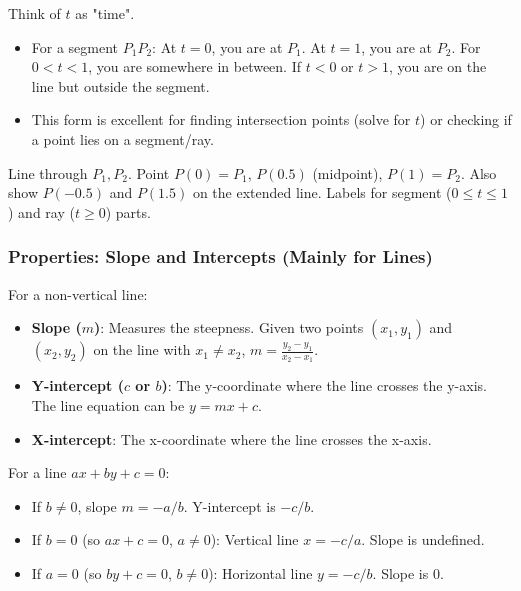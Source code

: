 \begin{intuition}
\label{intuition:A.1.2.parametric}
Think of $t$ as "time".
\begin{itemize}
    \item For a segment $P_1P_2$: At $t=0$, you are at $P_1$. At $t=1$, you are at $P_2$. For $0 < t < 1$, you are somewhere in between. If $t<0$ or $t>1$, you are on the line but outside the segment.
    \item This form is excellent for finding intersection points (solve for $t$) or checking if a point lies on a segment/ray.
\end{itemize}
\end{intuition}

\begin{visualexample}
\label{vis:A.1.2.parametric}
Line through $P_1, P_2$.
Point $P(0)=P_1$, $P(0.5)$ (midpoint), $P(1)=P_2$.
Also show $P(-0.5)$ and $P(1.5)$ on the extended line.
Labels for segment ($0 \le t \le 1$) and ray ($t \ge 0$) parts.
\end{visualexample}

\subsubsection{Properties: Slope and Intercepts (Mainly for Lines)}
\label{sssec:A.1.2.3}

\begin{definition}
\label{def:A.1.2.slope_intercept}
For a non-vertical line:
\begin{itemize}
    \item \textbf{Slope ($m$)}: Measures the steepness. Given two points $(x_1, y_1)$ and $(x_2, y_2)$ on the line with $x_1 \neq x_2$, $m = \frac{y_2 - y_1}{x_2 - x_1}$.
    \item \textbf{Y-intercept ($c$ or $b$)}: The y-coordinate where the line crosses the y-axis. The line equation can be $y = mx + c$.
    \item \textbf{X-intercept}: The x-coordinate where the line crosses the x-axis.
\end{itemize}
For a line $ax+by+c=0$:
\begin{itemize}
    \item If $b \neq 0$, slope $m = -a/b$. Y-intercept is $-c/b$.
    \item If $b = 0$ (so $ax+c=0$, $a \neq 0$): Vertical line $x = -c/a$. Slope is undefined.
    \item If $a = 0$ (so $by+c=0$, $b \neq 0$): Horizontal line $y = -c/b$. Slope is 0.
\end{itemize}
\end{definition}

